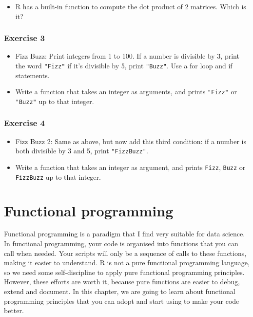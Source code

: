 \documentclass[]{gitbook}
\providecommand{\tightlist}{%
  \setlength{\itemsep}{0pt}\setlength{\parskip}{0pt}}
\begin{document}
\begin{itemize}
\tightlist
\item
  R has a built-in function to compute the dot product of 2 matrices. Which is it?
\end{itemize}

\hypertarget{exercise-3-3}{%
\subsubsection*{Exercise 3}\label{exercise-3-3}}

\begin{itemize}
\item
  Fizz Buzz: Print integers from 1 to 100. If a number is divisible by 3, print the word \texttt{"Fizz"} if
  it's divisible by 5, print \texttt{"Buzz"}. Use a for loop and if statements.
\item
  Write a function that takes an integer as arguments, and prints \texttt{"Fizz"} or \texttt{"Buzz"} up to that integer.
\end{itemize}

\hypertarget{exercise-4-1}{%
\subsubsection*{Exercise 4}\label{exercise-4-1}}

\begin{itemize}
\item
  Fizz Buzz 2: Same as above, but now add this third condition: if a number is both divisible by 3 and 5, print \texttt{"FizzBuzz"}.
\item
  Write a function that takes an integer as argument, and prints \texttt{Fizz}, \texttt{Buzz} or \texttt{FizzBuzz} up to that integer.
\end{itemize}

\hypertarget{functional-programming}{%
\section{Functional programming}\label{functional-programming}}

Functional programming is a paradigm that I find very suitable for data science. In functional
programming, your code is organised into functions that you can call when needed. Your scripts
will only be a sequence of calls to these functions, making it easier to understand. R is not a pure
functional programming language, so we need some self-discipline to apply pure functional programming
principles. However, these efforts are worth it, because pure functions are easier to debug, extend
and document. In this chapter, we are going to learn about functional programming principles that you
can adopt and start using to make your code better.
\end{document}
